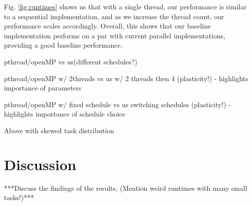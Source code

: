 Fig. \ref{fig:runtimes} shows us that with a single thread, our performance is similar to a sequential implementation, and as we increase the thread count, our performance scales accordingly. Overall, this shows that our baseline implementation performs on a par with current parallel implementations, providing a good baseline performance. 

pthread/openMP vs us(different schedules?)

pthread/openMP w/ 2threads vs us w/ 2 threads then 4 (plasticity!)       - highlights importance of parameters

pthread/openMP w/ fixed schedule vs us switching schedules (plasticity!) - highlights importance of schedule choice

 Above with skewed task distribution

\section{Discussion}

 ***Discuss the findings of the results, (Mention weird runtimes with many small tasks!)***